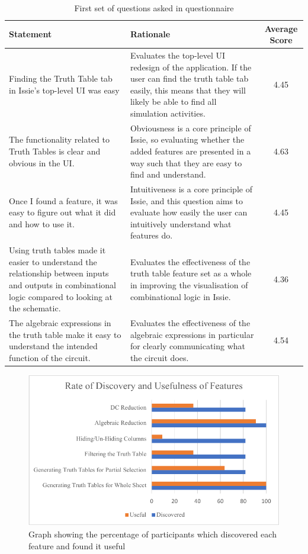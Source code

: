 \begin{table}[t]
    \centering
    \begin{tabular}{|m{5cm}|m{5.5cm}|c|}
    \hline
        \textbf{Statement} & \textbf{Rationale} & \textbf{Average Score} \\ \hline
        Finding the Truth Table tab in Issie's top-level UI was easy & Evaluates the top-level UI redesign of the application. If the user can find the truth table tab easily, this means that they will likely be able to find all simulation activities. & 4.45 \\ \hline
        The functionality related to Truth Tables is clear and obvious in the UI. & Obviousness is a core principle of Issie, so evaluating whether the added features are presented in a way such that they are easy to find and understand. & 4.63 \\ 
        \hline
        Once I found a feature, it was easy to figure out what it did and how to use it. & Intuitiveness is a core principle of Issie, and this question aims to evaluate how easily the user can intuitively understand what features do. & 4.45 \\ \hline
        Using truth tables made it easier to understand the relationship between inputs and outputs in combinational logic compared to looking at the schematic. & Evaluates the effectiveness of the truth table feature set as a whole in improving the visualisation of combinational logic in Issie. & 4.36 \\ \hline
        The algebraic expressions in the truth table make it easy to understand the intended function of the circuit. & Evaluates the effectiveness of the algebraic expressions in particular for clearly communicating what the circuit does. & 4.54 \\ \hline
    \end{tabular}
    \caption{First set of questions asked in questionnaire}
    \label{tab:strongqs}
\end{table}

\begin{figure}[b]
    \centering
    \includegraphics[width=\textwidth]{06.TestRes/graph.pdf}
    \caption{Graph showing the percentage of participants which discovered each feature and found it useful}
    \label{fig:discgraph}
\end{figure}

